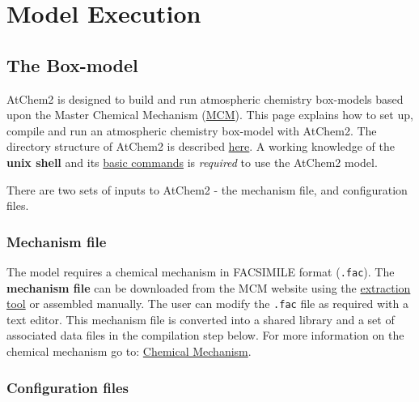 %
%
%
%
\chapter{Model Execution} \label{ch:execution}

\section{The Box-model} \label{sec:boxmodel}

AtChem2 is designed to build and run atmospheric chemistry box-models
based upon the Master Chemical Mechanism
(\href{http://mcm.leeds.ac.uk/MCM/}{MCM}). This page explains how to
set up, compile and run an atmospheric chemistry box-model with
AtChem2. The directory structure of AtChem2 is described
\hyperref[sec:structure]{here}. A working knowledge of the
\textbf{unix shell} and its
\href{https://swcarpentry.github.io/shell-novice/reference/}{basic
  commands} is \emph{required} to use the AtChem2 model.

There are two sets of inputs to AtChem2 - the mechanism file, and
configuration files.

\subsection{Mechanism file} \label{subsec:mechanism-file}

The model requires a chemical mechanism in FACSIMILE format
(\texttt{.fac}). The \textbf{mechanism file} can be downloaded from
the MCM website using the
\href{http://mcm.leeds.ac.uk/MCMv3.3.1/extract.htt}{extraction tool}
or assembled manually. The user can modify the \texttt{.fac} file as
required with a text editor. This mechanism file is converted into a
shared library and a set of associated data files in the compilation
step below. For more information on the chemical mechanism go to:
\hyperref[sec:mechanism]{Chemical Mechanism}.

\subsection{Configuration files} \label{subsec:configuration-files}

